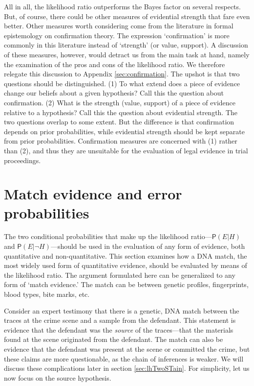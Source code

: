 \documentclass[
  10pt,
  dvipsnames,enabledeprecatedfontcommands]{scrartcl}
\newcommand{\pr}[1]{\mathsf{P}(#1)}
\begin{document}
\normalsize

All in all, the likelihood ratio outperforms the Bayes factor on several
respects. But, of course, there could be other measures of evidential
strength that fare even better. Other measures worth considering come
from the literature in formal epistemology on confirmation theory. The
expression `confirmation' is more commonly in this literature instead of
`strength' (or value, support). A discussion of these measures, however,
would detract us from the main task at hand, namely the examination of
the pros and cons of the likelihood ratio. We therefore relegate this
discussion to Appendix \ref{sec:confirmation}. The upshot is that two
questions should be distinguished. (1) To what extend does a piece of
evidence change our beliefs about a given hypothesis? Call this the
question about confirmation. (2) What is the strength (value, support)
of a piece of evidence relative to a hypothesis? Call this the question
about evidential strength. The two questions overlap to some extent. But
the difference is that confirmation depends on prior probabilities,
while evidential strength should be kept separate from prior
probabilities. Confirmation measures are concerned with (1) rather than
(2), and thus they are unsuitable for the evaluation of legal evidence
in trial proceedings.

\hypertarget{match-evidence-and-error-probabilities}{%
\section{\texorpdfstring{Match evidence and error probabilities
\label{sec:fp}}{Match evidence and error probabilities }}\label{match-evidence-and-error-probabilities}}

The two conditional probabilities that make up the likelihood
ratio---\(\pr{E \vert H}\) and \(\pr{E \vert \neg H}\)---should be used
in the evaluation of any form of evidence, both quantitative and
non-quantitative. This section examines how a DNA match, the most widely
used form of quantitative evidence, should be evaluated by means of the
likelihood ratio. The argument formulated here can be generalized to any
form of `match evidence.' The match can be between genetic profiles,
fingerprints, blood types, bite marks, etc.

Consider an expert testimony that there is a genetic, DNA match between
the traces at the crime scene and a sample from the defendant. This
statement is evidence that the defendant was the \textit{source} of the
traces---that the materials found at the scene originated from the
defendant. The match can also be evidence that the defendant was present
at the scene or committed the crime, but these claims are more
questionable, as the chain of inferences is weaker. We will discuss
these complications later in section \ref{sec:lhTwoSTain}. For
simplicity, let us now focus on the source hypothesis.
\end{document}
